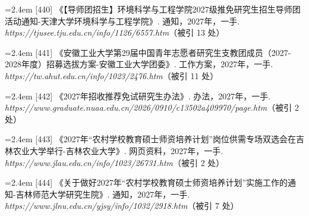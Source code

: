 {\vspace{0.6pt}
\noindent\hangindent=2.4em \label{src:S0588}{\color{cAccent}[440]} 《【导师团招生】环境科学与工程学院2027级推免研究生招生导师团活动通知-天津大学环境科学与工程学院》. 通知，2027年，一手. \textit{https://tjusee.tju.edu.cn/info/1126/6557.htm}（被引 13 处）\par
\vspace{0.6pt}
\vspace{3.5pt}\par
\nopagebreak\vspace{1pt}
\noindent\hangindent=2.4em \label{src:S0589}{\color{cAccent}[441]} 《安徽工业大学第29届中国青年志愿者研究生支教团成员（2027-2028年度）招募选拔方案-安徽工业大学团委》. 工作方案，2027年，一手. \textit{https://tw.ahut.edu.cn/info/1023/2476.htm}（被引 11 处）\par
\vspace{0.6pt}
\vspace{3.5pt}\par
\nopagebreak\vspace{1pt}
\noindent\hangindent=2.4em \label{src:S0591}{\color{cAccent}[442]} 《2027年招收推荐免试研究生办法》. 办法，2027年，一手. \textit{https://www.graduate.nuaa.edu.cn/2026/0910/c13502a409970/page.htm}（被引 2 处）\par
\vspace{0.6pt}
\vspace{3.5pt}\par
\nopagebreak\vspace{1pt}
\noindent\hangindent=2.4em \label{src:S0592}{\color{cAccent}[443]} 《2027年“农村学校教育硕士师资培养计划”岗位供需专场双选会在吉林农业大学举行-吉林农业大学》. 网页资料，2027年，一手. \textit{https://www.jlau.edu.cn/info/1023/26731.htm}（被引 2 处）\par
\vspace{0.6pt}
\vspace{3.5pt}\par
\nopagebreak\vspace{1pt}
\noindent\hangindent=2.4em \label{src:S0593}{\color{cAccent}[444]} 《关于做好2027年“农村学校教育硕士师资培养计划”实施工作的通知-吉林师范大学研究生院》. 通知，2027年，一手. \textit{https://www.jlnu.edu.cn/yjsy/info/1032/2918.htm}（被引 7 处）\par
}
